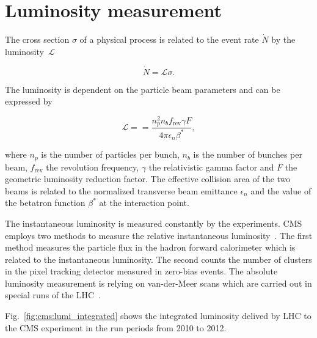 \section{Luminosity measurement}
\label{sec:lumi_measurement}

The cross section $\sigma$ of a physical process is related to the
event rate $\dot{N}$ by the luminosity~$\mathcal{L}$

\begin{equation*}
    \dot{N} = \mathcal{L} \sigma.
\end{equation*}

The luminosity is dependent on the particle beam parameters and can be expressed
by

\begin{equation*}
    \mathcal{L} = = \frac{n_p^2
        n_b f_\mathrm{rev} \gamma F}{4 \pi \epsilon_n \beta^*},
\end{equation*}

where $n_p$ is the number of particles per bunch, $n_b$ is the number of bunches
per beam, $f_\mathrm{rev}$ the revolution frequency, $\gamma$ the relativistic
gamma factor and $F$ the geometric luminosity reduction factor. The effective
collision area of the two beams is related to the normalized transverse beam
emittance $\epsilon_n$ and the value of the betatron function $\beta^*$ at the
interaction point.

The instantaneous luminosity is measured constantly by the experiments. CMS
employs two methods to measure the relative instantaneous
luminosity~\cite{CMS-PAS-LUM-13-001}. The first method measures the particle
flux in the hadron forward calorimeter which is related to the instantaneous
luminosity. The second counts the number of clusters in the pixel tracking
detector measured in zero-bias events. The absolute luminosity measurement is
relying on van-der-Meer scans which are carried out in special runs of the
LHC~\cite{vanderMeer:296752}.

Fig.~\ref{fig:cms:lumi_integrated} shows the integrated luminosity delived by
LHC to the CMS experiment in the run periods from 2010 to 2012.

